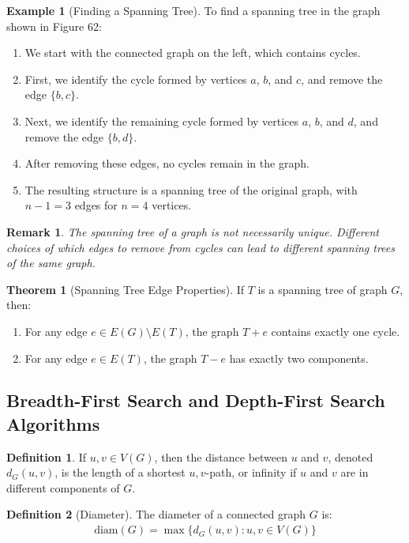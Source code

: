 \documentclass{article}
\newtheorem{remark}{Remark}
\theoremstyle{definition}
\newtheorem{example}{Example}
\newtheorem{theorem}{Theorem}
\newtheorem{definition}{Definition}
\begin{document}
\begin{example}[Finding a Spanning Tree]
To find a spanning tree in the graph shown in Figure 62:
\begin{enumerate}
    \item We start with the connected graph on the left, which contains cycles.
    \item First, we identify the cycle formed by vertices $a$, $b$, and $c$, and remove the edge $\{b,c\}$.
    \item Next, we identify the remaining cycle formed by vertices $a$, $b$, and $d$, and remove the edge $\{b,d\}$.
    \item After removing these edges, no cycles remain in the graph.
    \item The resulting structure is a spanning tree of the original graph, with $n-1 = 3$ edges for $n = 4$ vertices.
\end{enumerate}
\end{example}

\begin{remark}
The spanning tree of a graph is not necessarily unique. Different choices of which edges to remove from cycles can lead to different spanning trees of the same graph.
\end{remark}

\begin{theorem}[Spanning Tree Edge Properties]
If $T$ is a spanning tree of graph $G$, then:
\begin{enumerate}
    \item For any edge $e \in E(G) \setminus E(T)$, the graph $T + e$ contains exactly one cycle.
    \item For any edge $e \in E(T)$, the graph $T - e$ has exactly two components.
\end{enumerate}
\end{theorem}

\subsection{Breadth-First Search and Depth-First Search Algorithms}

\begin{definition}
If $u, v \in V(G)$, then the distance between $u$ and $v$, denoted $d_G(u,v)$, is the length of a shortest $u,v$-path, or infinity if $u$ and $v$ are in different components of $G$.
\end{definition}

\begin{definition}[Diameter]
The diameter of a connected graph $G$ is:
\begin{align*}
\text{diam}(G) = \max\{d_G(u,v) : u,v \in V(G)\}
\end{align*}
\end{definition}
\end{document}

